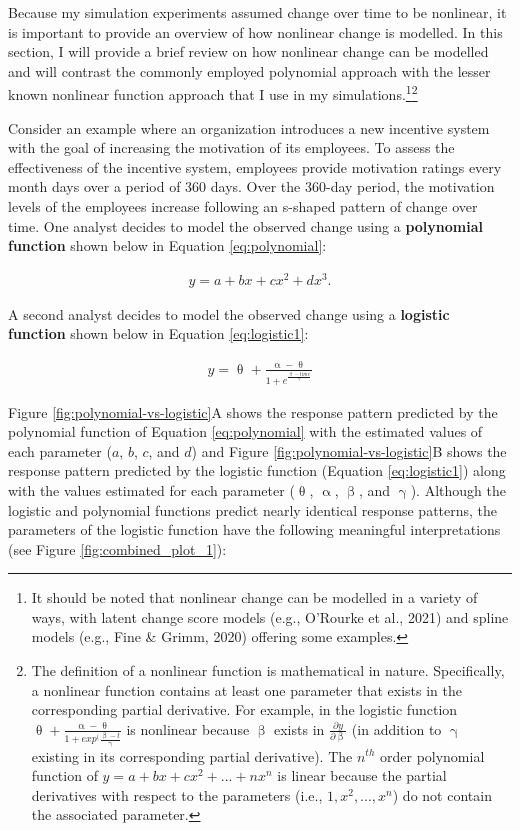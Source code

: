 \documentclass[
  english,
  man,floatsintext]{apa7}
\begin{document}
Because my simulation experiments assumed change over time to be nonlinear, it is important to provide an overview of how nonlinear change is modelled. In this section, I will provide a brief review on how nonlinear change can be modelled and will contrast the commonly employed polynomial approach with the lesser known nonlinear function approach that I use in my simulations.\footnote{It should be noted that nonlinear change can be modelled in a variety of ways, with latent change score models (e.g., O'Rourke et al., 2021) and spline models (e.g., Fine \& Grimm, 2020) offering some examples.}\footnote{The definition of a nonlinear function is mathematical in nature. Specifically, a nonlinear function contains at least one parameter that exists in the corresponding partial derivative. For example, in the logistic function $\uptheta + \frac{\upalpha - \uptheta}{1 + exp^(\frac{\upbeta - t}{\upgamma}}$ is nonlinear because $\upbeta$ exists in $\frac{\partial y}{\partial \upbeta}$ (in addition to $\upgamma$ existing in its corresponding partial derivative). The $n^{th}$ order polynomial function of $y = a + bx + cx^2 + ... + nx^n$ is linear because  the partial derivatives with respect to the parameters (i.e., $1, x^2, ..., x^n$) do not contain the associated parameter.}

Consider an example where an organization introduces a new incentive system with the goal of increasing the motivation of its employees. To assess the effectiveness of the incentive system, employees provide motivation ratings every month days over a period of 360 days. Over the 360-day period, the motivation levels of the employees increase following an s-shaped pattern of change over time. One analyst decides to model the observed change using a \textbf{polynomial function} shown below in Equation \ref{eq:polynomial}:

\begin{align}
  y = \mathit{a} + \mathit{b}x + \mathit{c}x^2 + \mathit{d}x^3.
  \label{eq:polynomial}
\end{align}

\noindent A second analyst decides to model the observed change using a \textbf{logistic function} shown below in Equation \ref{eq:logistic1}:

\begin{align}
  y = \uptheta + \frac{\upalpha - \uptheta}{1 + e^{\frac{\upbeta -time}{\upgamma}}}
  \label{eq:logistic1}
\end{align}

\noindent  Figure \ref{fig:polynomial-vs-logistic}A shows the response pattern predicted by the polynomial function of Equation \ref{eq:polynomial} with the estimated values of each parameter (\(a\), \(b\), \(c\), and \(d\)) and Figure \ref{fig:polynomial-vs-logistic}B shows the response pattern predicted by the logistic function (Equation \ref{eq:logistic1}) along with the values estimated for each parameter (\(\uptheta\), \(\upalpha\), \(\upbeta\), and \(\upgamma\)). Although the logistic and polynomial functions predict nearly identical response patterns, the parameters of the logistic function have the following meaningful interpretations (see Figure \ref{fig:combined_plot_1}):
\end{document}

